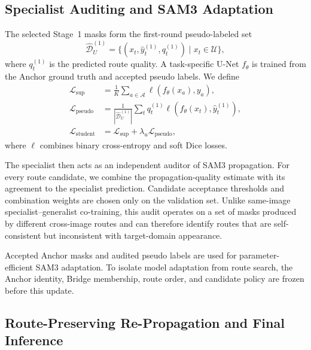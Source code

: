 \documentclass[a4paper,fleqn]{cas-dc}
\begin{document}
\subsection{Specialist Auditing and SAM3 Adaptation}\label{sec:collaboration}

The selected Stage~1 masks form the first-round pseudo-labeled set
\begin{equation}
\widehat{\mathcal{D}}_{U}^{(1)}=\{(x_t,\hat{y}_t^{(1)},q_t^{(1)})\mid x_t\in\mathcal{U}\},
\end{equation}
where $q_t^{(1)}$ is the predicted route quality. A task-specific U-Net $f_{\theta}$ is trained from the Anchor ground truth and accepted pseudo labels. We define
\begin{equation}
\begin{aligned}
\mathcal{L}_{\mathrm{sup}}&=\frac{1}{K}\sum_{a\in\mathcal{A}}
\ell(f_{\theta}(x_a),y_a),\\
\mathcal{L}_{\mathrm{pseudo}}&=\frac{1}{|\widehat{\mathcal{D}}_{U}^{(1)}|}
\sum_t q_t^{(1)}\ell(f_{\theta}(x_t),\hat{y}_t^{(1)}),\\
\mathcal{L}_{\mathrm{student}}&=\mathcal{L}_{\mathrm{sup}}
+\lambda_u\mathcal{L}_{\mathrm{pseudo}},
\end{aligned}
\end{equation}
where $\ell$ combines binary cross-entropy and soft Dice losses.

The specialist then acts as an independent auditor of SAM3 propagation. For every route candidate, we combine the propagation-quality estimate with its agreement to the specialist prediction. Candidate acceptance thresholds and combination weights are chosen only on the validation set. Unlike same-image specialist--generalist co-training, this audit operates on a set of masks produced by different cross-image routes and can therefore identify routes that are self-consistent but inconsistent with target-domain appearance.

Accepted Anchor masks and audited pseudo labels are used for parameter-efficient SAM3 adaptation. To isolate model adaptation from route search, the Anchor identity, Bridge membership, route order, and candidate policy are frozen before this update.


\subsection{Route-Preserving Re-Propagation and Final Inference}\label{sec:repropagation}
\end{document}

